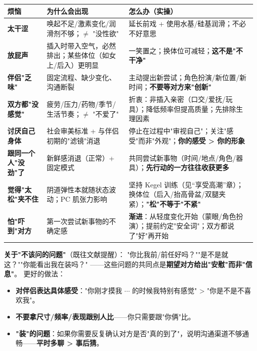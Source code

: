 \documentclass[12pt,UTF8,openany]{ctexbook}
\begin{document}
\begin{tabularx}{\textwidth}{@{}X X X@{}}
\toprule
\textbf{烦恼} & \textbf{为什么会出现} & \textbf{怎么办（实操）} \\
\midrule
\textbf{太干涩} & 唤起不足/激素变化/润滑剂不够；$\ne$ "没性欲" & 延长前戏 + 使用水基/硅基润滑；不必不好意思 \\
\midrule
\textbf{放屁声} & 插入时带入空气，必然排出；某些体位（如女上/后入）更明显 & 一笑置之；换体位可减轻；\textbf{这不是"不干净"} \\
\midrule
\textbf{伴侣"乏味"} & 固定流程、缺少变化、沟通断裂 & 主动提出新尝试；角色扮演/新位置/新时间；\textbf{不要等对方来"创新"} \\
\midrule
\textbf{双方都"没感觉"} & 疲劳/压力/药物/季节/生活节奏；$\ne$ "不爱了" & 折衷：非插入亲密（口交/爱抚/玩具）；降低频率但提高质量；先排除生理因素 \\
\midrule
\textbf{讨厌自己身体} & 社会审美标准 + 与伴侣初期的"滤镜"消退 & 停止在过程中"审视自己"；关注"感受"而非"外观"；\textbf{你的感受 > 你的形象} \\
\midrule
\textbf{跟同一个人"没劲"了} & 新鲜感消退（正常）+ 固定模式 & 共同尝试新事物（时间/地点/角色/器具）；\textbf{先行动的一方往往收获更多} \\
\midrule
\textbf{觉得"太松"夹不住} & 阴道弹性本就随状态波动；PC 肌张力影响 & 坚持 Kegel 训练（见“享受高潮”章）；换体位（后入/抬高骨盆/双腿夹紧）；\textbf{"松"不等于"不紧"} \\
\midrule
\textbf{怕"吓到"对方} & 第一次尝试新事物的不确定感 & \textbf{渐进}：从轻度变化开始（蒙眼/角色扮演）；提前约定"安全词"；双方都说了"好"再开始 \\
\bottomrule
\end{tabularx}

\vspace{1em}
\noindent\textbf{关于"不该问的问题"}（既往文献提醒）：
"你比我前/前任好吗？""是不是就这？""你能看出我在装吗？"
——这些问题的共同点是\textbf{期望对方给出"安慰"而非"信息"}。
更好的做法：
\begin{itemize}[leftmargin=2em,itemsep=0.3em]
  \item \textbf{对伴侣表达具体感受}："你刚才摸我 $\cdots$ 的时候我特别有感觉" > "你是不是不喜欢我"。
  \item \textbf{不要拿尺寸/频率/表现跟别人比}——你只需要跟"你俩"比。
  \item \textbf{"装"的问题}：如果你需要反复确认对方是否"真的到了"，说明沟通渠道不够通畅——\textbf{平时多聊 > 事后猜}。
\end{itemize}
\end{document}
